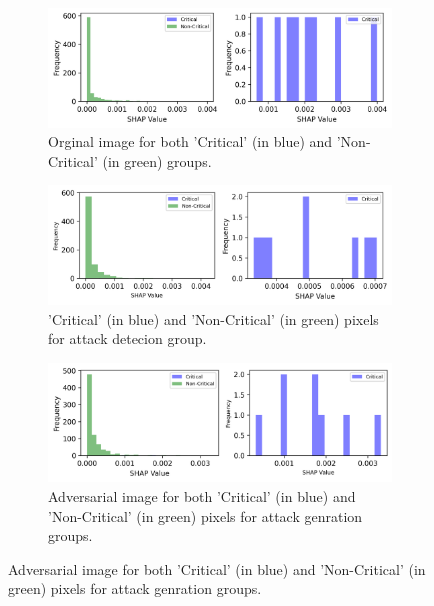 \documentclass[10pt, conference, a4paper, final]{IEEEtran}
\begin{document}
    \begin{figure}[h]
        \centering
     
        \begin{subfigure}{\columnwidth}
            \centering
            \includegraphics[width=\linewidth]{paper_images/Originalhistograms.png}
            \caption{ Orginal image for both 'Critical' (in blue) and 'Non-Critical' (in green) groups.}
           
        \end{subfigure}
        \par\medskip %

        \begin{subfigure}{\columnwidth}
            \centering
            \includegraphics[width=\linewidth]{paper_images/Detectionhistograms.png}
            \caption{'Critical' (in blue) and 'Non-Critical' (in green) pixels for attack detecion group.}
        \end{subfigure}
        \par\medskip %
        \begin{subfigure}{\columnwidth}
            \centering
            \includegraphics[width=\linewidth]{paper_images/Generationhistograms.png}
            \caption{Adversarial image for both 'Critical' (in blue) and 'Non-Critical' (in green) pixels for attack genration groups.}
          

\end{subfigure}
\end{figure}
\end{document}
